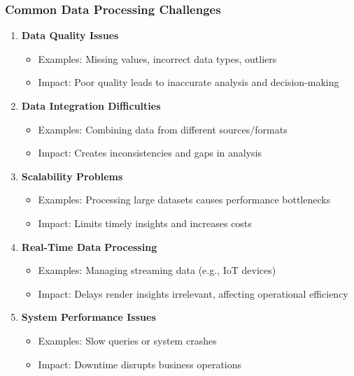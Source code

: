 \documentclass[aspectratio=169]{beamer}
\begin{document}
\begin{frame}
  \frametitle{Common Data Processing Challenges}
  \begin{enumerate}
    \item \textbf{Data Quality Issues} 
      \begin{itemize}
        \item Examples: Missing values, incorrect data types, outliers
        \item Impact: Poor quality leads to inaccurate analysis and decision-making
      \end{itemize}
    
    \item \textbf{Data Integration Difficulties}
      \begin{itemize}
        \item Examples: Combining data from different sources/formats
        \item Impact: Creates inconsistencies and gaps in analysis
      \end{itemize}

    \item \textbf{Scalability Problems}
      \begin{itemize}
        \item Examples: Processing large datasets causes performance bottlenecks
        \item Impact: Limits timely insights and increases costs
      \end{itemize}

    \item \textbf{Real-Time Data Processing}
      \begin{itemize}
        \item Examples: Managing streaming data (e.g., IoT devices)
        \item Impact: Delays render insights irrelevant, affecting operational efficiency
      \end{itemize}

    \item \textbf{System Performance Issues}
      \begin{itemize}
        \item Examples: Slow queries or system crashes
        \item Impact: Downtime disrupts business operations
      \end{itemize}
  \end{enumerate}
\end{frame}
\end{document}
